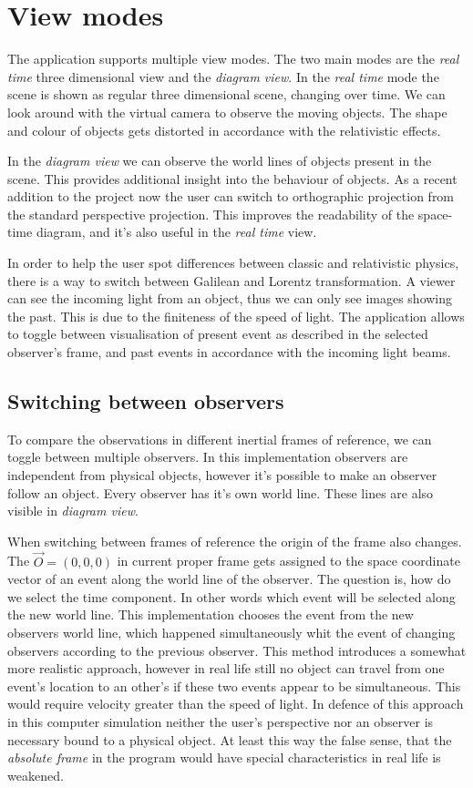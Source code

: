 \documentclass{egpubl}
\begin{document}
\section{View modes}
The application supports multiple view modes. The two main modes are the \emph{real time} three dimensional view and the \emph{diagram view}. In the \emph{real time} mode the scene is shown as regular three dimensional scene, changing over time. We can look around with the virtual camera to observe the moving objects. The shape and colour of objects gets distorted in accordance with the relativistic effects. 

In the \emph{diagram view} we can observe the world lines of objects present in the scene. This provides additional insight into the behaviour of objects. As a recent addition to the project now the user can switch to orthographic projection from the standard perspective projection. This improves the readability of the space-time diagram, and it's also useful in the \emph{real time} view.

In order to help the user spot differences between classic and relativistic physics, there is a way to switch between Galilean \cite{KHGalilei} and Lorentz transformation. A viewer can see the incoming light from an object, thus we can only see images showing the past. This is due to the finiteness of the speed of light. The application allows to toggle between visualisation of present event as described in the selected observer's frame, and past events in accordance with the incoming light beams.

\subsection{Switching between observers}
To compare the observations in different inertial frames of reference, we can toggle between multiple observers. In this implementation observers are independent from physical objects, however it's possible to make an observer follow an object. Every observer has it's own world line. These lines are also visible in \emph{diagram view}.

When switching between frames of reference the origin of the frame also changes. The $\vec{O} =(0,0,0)$ in current proper frame gets assigned to the space coordinate vector of an event along the world line of the observer. The question is, how do we select the time component. In other words which event will be selected along the new world line. This implementation chooses the event from the new observers world line, which happened simultaneously whit the event of changing observers according to the previous observer. This method introduces a somewhat more realistic approach, however in real life still no object can travel from one event's location to an other's if these two events appear to be simultaneous. This would require velocity greater than the speed of light. In defence of this approach in this computer simulation neither the user's perspective nor an observer is necessary bound to a physical object. At least this way the false sense, that the \emph{absolute frame} in the program would have special characteristics in real life is weakened.
\end{document}

